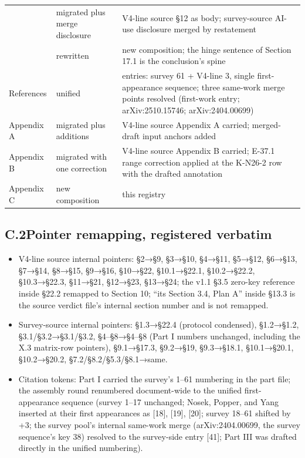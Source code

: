 \documentclass[11pt]{article}
\begin{document}
\begin{longtable}{@{}>{\raggedright\arraybackslash}p{} p{} >{\raggedright\arraybackslash}p{}@{}}
23 & migrated plus merge disclosure & V4-line source §12 as body; survey-source AI-use disclosure merged by restatement \\
24 & rewritten & new composition; the hinge sentence of Section 17.1 is the conclusion's spine \\
References & unified & 64 entries: survey 61 + V4-line 3, single first-appearance sequence; three same-work merge points resolved (first-work entry; arXiv:2510.15746; arXiv:2404.00699) \\
Appendix A & migrated plus additions & V4-line source Appendix A carried; merged-draft input anchors added \\
Appendix B & migrated with one correction & V4-line source Appendix B carried; E-37.1 range correction applied at the K-N26-2 row with the drafted annotation \\
Appendix C & new composition & this registry \\
\bottomrule
\end{longtable}
\endgroup
\subsection*{C.2\quad Pointer remapping, registered verbatim}
\begin{itemize}[leftmargin=1.6em,itemsep=2pt,parsep=0pt,topsep=3pt]
\item V4-line source internal pointers: §2→§9, §3→§10, §4→§11, §5→§12, §6→§13, §7→§14, §8→§15, §9→§16, §10→§22, §10.1→§22.1, §10.2→§22.2, §10.3→§22.3, §11→§21, §12→§23, §13→§24; the v1.1 §3.5 zero-key reference inside §22.2 remapped to Section 10; ``its Section 3.4, Plan A'' inside §13.3 is the source verdict file's internal section number and is not remapped.
\item Survey-source internal pointers: §1.3→§22.4 (protocol condensed), §1.2→§1.2, §3.1/§3.2→§3.1/§3.2, §4–§8→§4–§8 (Part I numbers unchanged, including the X.3 matrix-row pointers), §9.1→§17.3, §9.2→§19, §9.3→§18.1, §10.1→§20.1, §10.2→§20.2, §7.2/§8.2/§5.3/§8.1→same.
\item Citation tokens: Part I carried the survey's 1–61 numbering in the part file; the assembly round renumbered document-wide to the unified first-appearance sequence (survey 1–17 unchanged; Nosek, Popper, and Yang inserted at their first appearances as [18], [19], [20]; survey 18–61 shifted by +3; the survey pool's internal same-work merge (arXiv:2404.00699, the survey sequence's key 38) resolved to the survey-side entry [41]; Part III was drafted directly in the unified numbering).
\end{itemize}
\end{document}
